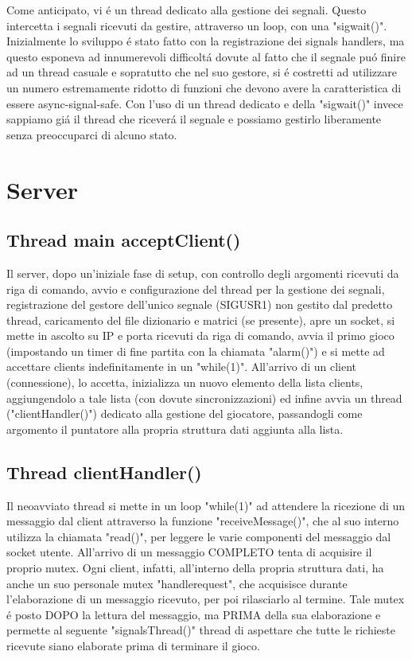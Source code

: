 Come anticipato, vi \'e un thread dedicato alla gestione dei segnali. Questo intercetta i segnali ricevuti da gestire, attraverso un loop, con una "sigwait()". Inizialmente lo sviluppo \'e stato fatto con la registrazione dei signals handlers, ma questo esponeva ad innumerevoli difficolt\'a dovute al fatto che il segnale pu\'o finire ad un thread casuale e sopratutto che nel suo gestore, si \'e costretti ad utilizzare un numero estremamente ridotto di funzioni che devono avere la caratteristica di essere async-signal-safe. Con l'uso di un thread dedicato e della "sigwait()" invece sappiamo gi\'a il thread che ricever\'a il segnale e possiamo gestirlo liberamente senza preoccuparci di alcuno stato.

\section{Server}

\subsection{Thread main acceptClient()}

Il server, dopo un'iniziale fase di setup, con controllo degli argomenti ricevuti da riga di comando, avvio e configurazione del thread per la gestione dei segnali, registrazione del gestore dell'unico segnale (SIGUSR1) non gestito dal predetto thread, caricamento del file dizionario e matrici (se presente), apre un socket, si mette in ascolto su IP e porta ricevuti da riga di comando, avvia il primo gioco (impostando un timer di fine partita con la chiamata "alarm()") e si mette ad accettare clients indefinitamente in un "while(1)". All'arrivo di un client (connessione), lo accetta, inizializza un nuovo elemento della lista clients, aggiungendolo a tale lista (con dovute sincronizzazioni) ed infine avvia un thread ("clientHandler()") dedicato alla gestione del giocatore, passandogli come argomento il puntatore alla propria struttura dati aggiunta alla lista.

 \subsection{Thread clientHandler()}

 Il neoavviato thread si mette in un loop "while(1)" ad attendere la ricezione di un messaggio dal client attraverso la funzione "receiveMessage()", che al suo interno utilizza la chiamata "read()", per leggere le varie componenti del messaggio dal socket utente. All'arrivo di un messaggio COMPLETO tenta di acquisire il proprio mutex. Ogni client, infatti, all'interno della propria struttura dati, ha anche un suo personale mutex "handlerequest", che acquisisce durante l'elaborazione di un messaggio ricevuto, per poi rilasciarlo al termine. Tale mutex \'e posto DOPO la lettura del messaggio, ma PRIMA della sua elaborazione e permette al seguente "signalsThread()" thread di aspettare che tutte le richieste ricevute siano elaborate prima di terminare il gioco.
 

